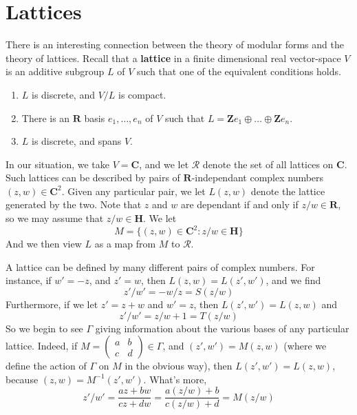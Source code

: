 \section{Lattices}

There is an interesting connection between the theory of modular forms and the theory of lattices. Recall that a {\bf lattice} in a finite dimensional real vector-space $V$ is an additive subgroup $L$ of $V$ such that one of the equivalent conditions holds.
%
\begin{enumerate}
    \item $L$ is discrete, and $V/L$ is compact.
    \item There is an $\mathbf{R}$ basis $e_1, \dots, e_n$ of $V$ such that $L = \mathbf{Z} e_1 \oplus \dots \oplus \mathbf{Z} e_n$.
    \item $L$ is discrete, and spans $V$.
\end{enumerate}
%
In our situation, we take $V = \mathbf{C}$, and we let $\mathcal{R}$ denote the set of all lattices on $\mathbf{C}$. Such lattices can be described by pairs of $\mathbf{R}$-independant complex numbers $(z,w) \in \mathbf{C}^2$. Given any particular pair, we let $L(z,w)$ denote the lattice generated by the two. Note that $z$ and $w$ are dependant if and only if $z/w \in \mathbf{R}$, so we may assume that $z/w \in \mathbf{H}$. We let
%
\[ M = \{ (z,w) \in \mathbf{C}^2 : z/w \in \mathbf{H} \} \]
%
And we then view $L$ as a map from $M$ to $\mathcal{R}$.

A lattice can be defined by many different pairs of complex numbers. For instance, if $w' = -z$, and $z' = w$, then $L(z,w) = L(z',w')$, and we find
%
\[ z'/w' = -w/z = S(z/w) \]
%
Furthermore, if we let $z' = z + w$ and $w' = z$, then $L(z',w') = L(z,w)$ and
%
\[ z'/w' = z/w + 1 = T(z/w) \]
%
So we begin to see $\Gamma$ giving information about the various bases of any particular lattice. Indeed, if $M = \left( \begin{smallmatrix} a & b \\ c & d \end{smallmatrix} \right) \in \Gamma$, and $(z',w') = M(z,w)$ (where we define the action of $\Gamma$ on $M$ in the obvious way), then $L(z', w') = L(z, w)$, because $(z,w) = M^{-1}(z',w')$. What's more,
%
\[ z'/w' = \frac{az + bw}{cz + dw} = \frac{a(z/w) + b}{c(z/w) + d} = M(z/w) \]

